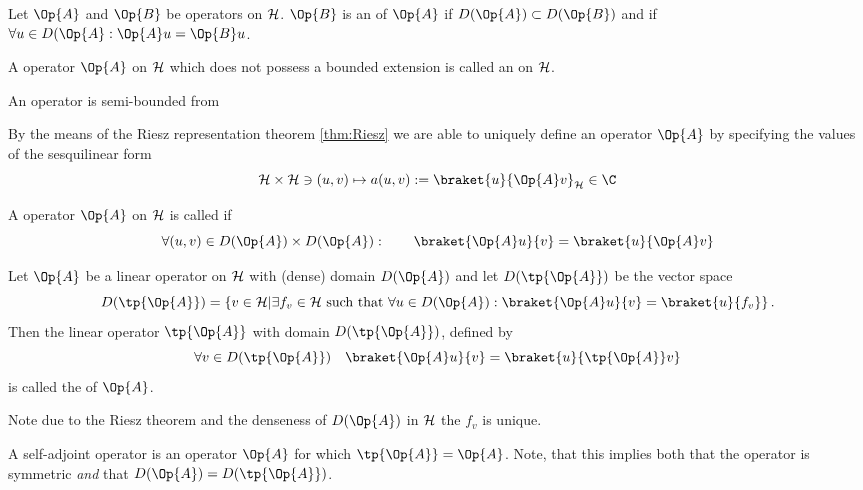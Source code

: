 \begin{defn}
	Let $\Op{A}$ and $\Op{B}$ be operators on $\mathcal{H}$.
	$\Op{B}$ is an  of $\Op{A}$ if $D(\Op{A}) \subset D(\Op{B})$
	and if $\forall u \in D(\Op{A}: \Op{A}u = \Op{B}u$.
\end{defn}

\begin{defn}
	A operator $\Op{A}$ on $\mathcal{H}$ which does not possess
	a bounded extension is called an  on $\mathcal{H}$.
\end{defn}

\begin{defn}
	An operator is semi-bounded from
\end{defn}

\begin{rem}
By the means of the Riesz representation theorem \vref{thm:Riesz}
we are able to uniquely define an operator $\Op{A}$ by
specifying the values of the sesquilinear form
\begin{equation}
	\hilbert \times \hilbert \ni (u, v) \mapsto a(u, v) := \braket{u}{\Op{A} v}_\hilbert \in \C
	\label{eqn:formA}
\end{equation}
\end{rem}

\begin{defn}
	A operator $\Op{A}$ on $\mathcal{H}$ is called  if
	\[ \forall (u, v) \in D(\Op{A}) \times D(\Op{A}): \qquad \braket{\Op{A} u}{v} = \braket{u}{\Op{A} v} \]
\end{defn}

\begin{defn}
	Let $\Op{A}$ be a linear operator on $\mathcal{H}$ with (dense) domain $D(\Op{A})$
	and let $D(\tp{\Op{A}})$ be the vector space
	\[ D(\tp{\Op{A}}) = \left\{ v \in \hilbert \middle|
		\exists f_v \in \hilbert \ \text{such that} \
		\forall u \in D(\Op{A}): \braket{\Op{A} u}{v} = \braket{u}{f_v} \right\}.
	\]
	Then the linear operator $\tp{\Op{A}}$ with domain $D(\tp{\Op{A}})$,
	defined by
	\[ \forall v \in D(\tp{\Op{A}}) \quad \braket{\Op{A} u}{v} = \braket{u}{\tp{\Op{A}} v} \]
	is called the \newterm{adjoint} of $\Op{A}$.
\end{defn}
Note due to the Riesz theorem and the denseness of $D(\Op{A})$ in $\mathcal{H}$
the $f_v$ is unique.

\begin{defn}
	A self-adjoint operator is an operator $\Op{A}$ for which $\tp{\Op{A}} = \Op{A}$.
	Note, that this implies both that the operator is symmetric \emph{and}
	that $D(\Op{A}) = D(\tp{\Op{A}})$.
\end{defn}

